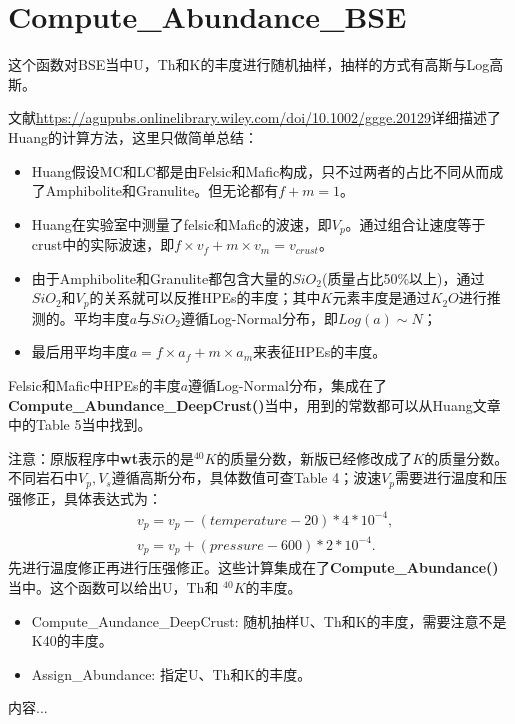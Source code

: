 	\section{Compute\_Abundance\_BSE}
		这个函数对BSE当中U，Th和K的丰度进行随机抽样，抽样的方式有高斯与Log高斯。
		\begin{GCBox}[title = Huang method]{}
			文献\href{https://agupubs.onlinelibrary.wiley.com/doi/10.1002/ggge.20129}{https://agupubs.onlinelibrary.wiley.com/doi/10.1002/ggge.20129}详细描述了Huang的计算方法，这里只做简单总结：
				\begin{itemize}
					\item Huang假设MC和LC都是由Felsic和Mafic构成，只不过两者的占比不同从而成了Amphibolite和Granulite。但无论都有$f + m = 1$。
					\item Huang在实验室中测量了felsic和Mafic的波速，即$V_p$。通过组合让速度等于crust中的实际波速，即$f\times v_f + m\times v_m = v_{crust}$。
					\item 由于Amphibolite和Granulite都包含大量的$SiO_2$(质量占比50\%以上)，通过$SiO_2$和$V_p$的关系就可以反推HPEs的丰度；其中$K$元素丰度是通过$K_2O$进行推测的。平均丰度$a$与$SiO_2$遵循Log-Normal分布，即$Log(a) \sim N$；
					\item 最后用平均丰度$a = f\times a_f + m\times a_m$来表征HPEs的丰度。
				\end{itemize}
			Felsic和Mafic中HPEs的丰度$a$遵循Log-Normal分布，集成在了\textbf{Compute\_Abundance\_DeepCrust()}当中，用到的常数都可以从Huang文章中的Table 5当中找到。\par
			{\color{red}注意：原版程序中\textbf{wt}表示的是${}^{40}K$的质量分数，新版已经修改成了$K$的质量分数。}
		\tcbline
			不同岩石中$V_p, V_s$遵循高斯分布，具体数值可查Table 4；波速$V_p$需要进行温度和压强修正，具体表达式为：
				\begin{align}
					&v_p = v_p - (temperature - 20) * 4 * 10^{-4},\\
					&v_p = v_p + (pressure - 600) * 2 *10^{-4}.
				\end{align}
			先进行温度修正再进行压强修正。这些计算集成在了\textbf{Compute\_Abundance()}当中。这个函数可以给出U，Th和 ${}^{40}K$的丰度。
		\end{GCBox}
		\begin{RCBox}[title = 丰度小记]{}
			\begin{itemize}
				\item Compute\_Aundance\_DeepCrust: 随机抽样U、Th和K的丰度，需要注意不是K40的丰度。
				\item Assign\_Abundance: 指定U、Th和K的丰度。
			\end{itemize}
		\end{RCBox}
		\begin{GCBox}[title = BSE丰度]{}
			内容...
		\end{GCBox}
